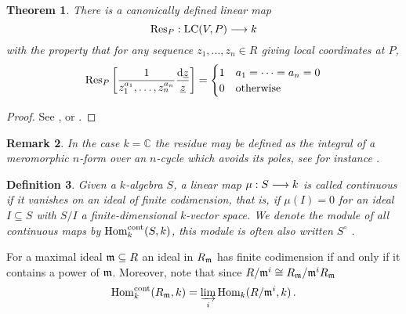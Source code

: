 \documentclass[english,letter paper,12pt,reqno]{article}
\newtheorem{theorem}{Theorem}[section]
\theoremstyle{example}
\newtheorem{definition}[theorem]{Definition}
\newtheorem{remark}[theorem]{Remark}
\numberwithin{equation}{section}
\def\Hom{\operatorname{Hom}}
\DeclareMathOperator{\LC}{LC}
\begin{document}

  
\begin{theorem}\label{theorem:compute_res} There is a canonically defined linear map
\[
\Res_{P}: \LC(V,P) \lto k
\]
with the property that for any sequence $z_1,\ldots,z_n \in R$ giving local coordinates at $P$,
\[
\operatorname{Res}\!_{P} \left[ \frac{1}{z_1^{a_1}, \ldots, z_n^{a_n}} \frac{\operatorname{d}\!{\underline{z}}}{\underline{z}} \right] = \begin{cases} 1 & a_1 = \cdots = a_n = 0 \\ 0 & \textup{otherwise} \end{cases}
\]
\end{theorem} 
\begin{proof}
See \cite[\S 5.3]{Lipman01}, \cite[pp.64--67]{Lipman84} or \cite{Kunz08}.
\end{proof}

\begin{remark} In the case $k = \mathbb{C}$ the residue may be defined as the integral of a meromorphic $n$-form over an $n$-cycle which avoids its poles, see for instance \cite[Chapter V]{Griffiths}.
\end{remark}

\begin{definition} Given a $k$-algebra $S$, a linear map $\mu: S \longrightarrow k$ is called \emph{continuous} if it vanishes on an ideal of finite codimension, that is, if $\mu( I ) = 0$ for an ideal $I \subseteq S$ with $S/I$ a finite-dimensional $k$-vector space. We denote the module of all continuous maps by $\Hom_k^{\cont}(S,k)$, this module is often also written $S^{\circ}$ \cite[Chapter 6]{sweedler}.
\end{definition}

For a maximal ideal $\mathfrak{m} \subseteq R$ an ideal in $R_{\mathfrak{m}}$ has finite codimension if and only if it contains a power of $\mathfrak{m}$. Moreover, note that since $R/\mathfrak{m}^i \cong R_{\mathfrak{m}}/\mathfrak{m}^i R_{\mathfrak{m}}$
\begin{equation}\label{eq:contmap}
\Hom_k^{\cont}(R_{\mf{m}},k) = \varinjlim_i \Hom_k( R/\mf{m}^i, k)\,.
\end{equation}
\end{document}
